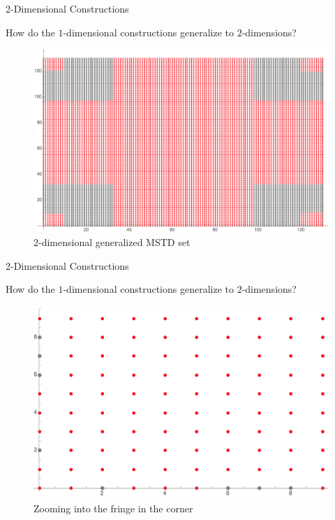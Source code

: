 \documentclass[11pt]{beamer}
\begin{document}

\begin{frame}{2-Dimensional Constructions}

How do the $1$-dimensional constructions generalize to $2$-dimensions?
\pause

\begin{figure}
    \centering
    \includegraphics[scale=.35]{generalized_MSTD_set.png}
    \caption{$2$-dimensional generalized MSTD set}
    \label{fig:2dGenMSTD}
\end{figure}

\end{frame}


\begin{frame}{2-Dimensional Constructions}

How do the $1$-dimensional constructions generalize to $2$-dimensions?

\pause
\begin{figure}
    \centering
    \includegraphics[scale=.45]{fringe_set.png}
    \caption{Zooming into the fringe in the corner}
    \label{fig:2dFringe}
\end{figure}

\end{frame}
\end{document}
